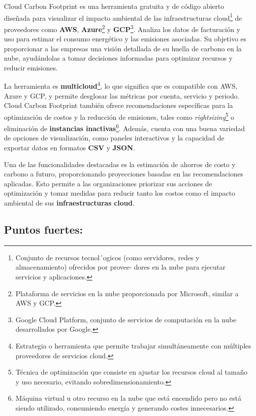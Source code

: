 \documentclass[12pt,a4paper]{report}
\begin{document}
Cloud Carbon Footprint es una herramienta gratuita y de código abierto diseñada
para visualizar el impacto ambiental de las infraestructuras cloud\footnote{Conjunto de recursos tecnol´ogicos (como servidores, redes y almacenamiento) ofrecidos por provee-
  dores en la nube para ejecutar servicios y aplicaciones.} de
proveedores como \textbf{AWS}, \textbf{Azure}\footnote{Plataforma de
  servicios en la nube proporcionada por Microsoft, similar a AWS y GCP.} y
\textbf{GCP}\footnote{Google Cloud Platform, conjunto de servicios de
  computación en la nube desarrollados por Google.}. Analiza los datos de
facturación y uso para estimar el consumo energético y las emisiones asociadas.
Su objetivo es proporcionar a las empresas una visión detallada de su huella de
carbono en la nube, ayudándolas a tomar decisiones informadas para optimizar
recursos y reducir emisiones.

La herramienta es \textbf{multicloud}\footnote{Estrategia o herramienta que
  permite trabajar simultáneamente con múltiples proveedores de servicios
  cloud.}, lo que significa que es compatible con AWS, Azure y GCP, y permite
desglosar las métricas por cuenta, servicio y periodo. Cloud Carbon Footprint
también ofrece recomendaciones específicas para la optimización de costos y la
reducción de emisiones, tales como \textit{rightsizing}\footnote{Técnica de
  optimización que consiste en ajustar los recursos cloud al tamaño y uso
  necesario, evitando sobredimensionamiento.} o eliminación de \textbf{instancias
  inactivas}\footnote{Máquina virtual u otro recurso en la nube que está
  encendido pero no está siendo utilizado, consumiendo energía y generando costes
  innecesarios.}. Además, cuenta con una buena variedad de opciones de
visualización, como paneles interactivos y la capacidad de exportar datos en
formatos \textbf{CSV} y \textbf{JSON}.

Una de las funcionalidades destacadas es la estimación de ahorros de costo y
carbono a futuro, proporcionando proyecciones basadas en las recomendaciones
aplicadas. Esto permite a las organizaciones priorizar sus acciones de
optimización y tomar medidas para reducir tanto los costos como el impacto
ambiental de sus \textbf{infraestructuras cloud}.

\subsection*{Puntos fuertes:}
\end{document}
